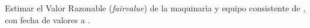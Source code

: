 Estimar el Valor Razonable (\textit{\gls{fairvalue}}) de la maquinaria y equipo consistente de \textcolor{principal}{\descripcionBien}, con fecha de valores a \textcolor{principal}{\fechaValores}.